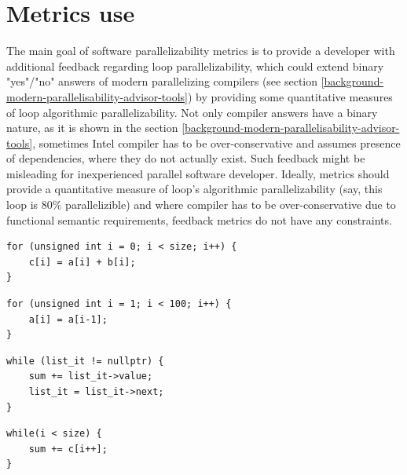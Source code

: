 \section{Metrics use}
\label{metrics-use}
\qquad The main goal of software parallelizability metrics is to provide a developer with additional feedback regarding loop parallelizability, which could extend binary "yes"/"no" answers of modern parallelizing compilers (see section \ref{background-modern-parallelisability-advisor-tools}) by providing some quantitative measures of loop algorithmic parallelizability. Not only compiler answers have a binary nature, as it is shown in the section \ref{background-modern-parallelisability-advisor-tools}, sometimes Intel compiler has to be over-conservative and assumes presence of dependencies, where they do not actually exist. Such feedback might be misleading for inexperienced parallel software developer.\newline   
\null\qquad Ideally, metrics should provide a quantitative measure of loop's algorithmic parallelizability (say, this loop is 80\% parallelizible) and where compiler has to be over-conservative due to functional semantic requirements, feedback metrics do not have any constraints.

\begin{lstlisting}[caption={Example of 100\% parallelizible loop. Intel compiler successfully parallelizes it.}, captionpos=b, label=lst:metrics-loop-motivation-0]
for (unsigned int i = 0; i < size; i++) {
	c[i] = a[i] + b[i];
}
\end{lstlisting}


\begin{lstlisting}[caption={Loop with true cross iteration dependency. Intel compiler detects dependency and refuses to parallelize the loop.}, captionpos=b, label=lst:metrics-loop-motivation-1]
for (unsigned int i = 1; i < 100; i++) {
	a[i] = a[i-1];
}
\end{lstlisting}

\begin{lstlisting}[caption={Algorithmic reduction, hidden behind unsuccessful data structure choice (linked-list). If linear array was used instead, the loop would be parallelized by Intel compiler.}, captionpos=b, label=lst:metrics-loop-motivation-2]
while (list_it != nullptr) {
	sum += list_it->value;
    list_it = list_it->next;
}
\end{lstlisting}

\begin{lstlisting}[caption={Loop with optimal data structure choice for algorithmic reduction. Intel compiler successfully parallelizes it.}, captionpos=b, label=lst:metrics-loop-motivation-3]
while(i < size) {
	sum += c[i++];
}
\end{lstlisting}

